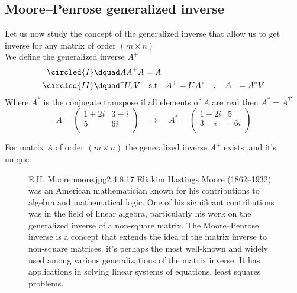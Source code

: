 \subsection{Moore–Penrose generalized inverse}
Let us now study the concept of the generalized inverse that allow us to get inverse for any matrix of order $(m\times n)$ 
\\
We define the generalized inverse $A^{+}$
\begin{align*}
        \circled{I}& \dquad AA^{+}A = A
        \\
        \circled{II}& \dquad \exists  U,V \quad \text{s.t} \quad A^{+} = UA^{*} \quad,\quad A^{+} = A^{*}V
\end{align*}
Where $A^{*}$ is the conjugate transpose if all elements of $A$ are real then $A^{*} = A^{\operatorname{T}}$
\[
A = \begin{pmatrix}
        1+2i & 3-i\\
        5 & 6i \\
    \end{pmatrix}
\quad\Longrightarrow \quad
A^{*} = \begin{pmatrix}
        1-2i & 5\\
        3+i & -6i \\
    \end{pmatrix}
\]
\begin{theorem}
        For matrix $A$ of order $(m\times n)$ the generalized inverse $A^{+}$ exists ,and it's unique
\end{theorem}
\begin{figure}[b]
        \begin{enrichment}{E.H. Moore}{moore.jpg}{2.4}{.8}{.17}
        Eliakim Hastings Moore (1862–1932) was an American mathematician known for his contributions to algebra and mathematical logic. 
        One of his significant contributions was in the field of linear algebra, 
        particularly his work on the generalized inverse of a non-square matrix.
        The Moore–Penrose inverse is a concept that extends the idea of the matrix inverse to non-square matrices.
        it's perhaps the most well-known and widely used among various generalizations of the matrix inverse. 
        It has applications in solving linear systems of equations, least squares problems.
\end{enrichment}
\end{figure}
